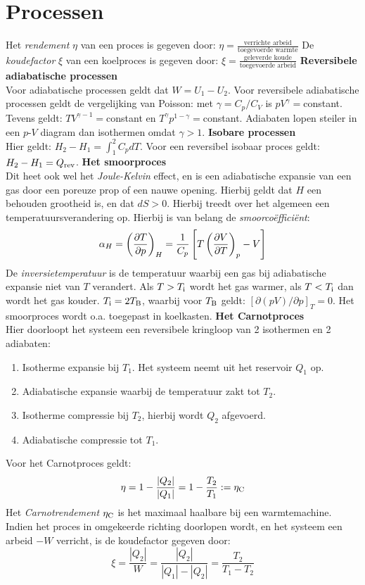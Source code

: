 \section{Processen}
Het {\it rendement} $\eta$ van een proces is gegeven door:
$\displaystyle\eta=\frac{\mbox{verrichte arbeid}}{\mbox{toegevoerde warmte}}$
\npar
De {\it koudefactor} $\xi$ van een koelproces is gegeven door:
$\displaystyle\xi=\frac{\mbox{geleverde koude}}{\mbox{toegevoerde arbeid}}$
\npar
{\bf Reversibele adiabatische processen}\\[2mm]
Voor adiabatische processen geldt dat $W=U_1-U_2$. Voor reversibele
adiabatische processen geldt de vergelijking van Poisson: met
$\gamma=C_p/C_V$ is $pV^\gamma=$constant. Tevens geldt:
$TV^{\gamma-1}=$constant en $T^\gamma p^{1-\gamma}=$constant. Adiabaten lopen
steiler in een $p$-$V$ diagram dan isothermen omdat $\gamma>1$.
\npar
{\bf Isobare processen}\\[2mm]
Hier geldt: $H_2-H_1=\int_1^2 C_pdT$. Voor een reversibel isobaar proces
geldt: $H_2-H_1=Q_{\rm rev}$.
\npar
{\bf Het smoorproces}\\[2mm]
Dit heet ook wel het {\it Joule-Kelvin} effect, en is een adiabatische
expansie van een gas door een poreuze prop of een nauwe opening. Hierbij
geldt dat $H$ een behouden grootheid is, en dat $dS>0$. Hierbij treedt over
het algemeen een temperatuursverandering op. Hierbij is van belang de
{\it smoorco\"effici\"ent}:
\[
\alpha_H=\left(\frac{\partial T}{\partial p}\right)_{H}=\frac{1}{C_p}\left[T\left(\frac{\partial V}{\partial T}\right)_{p}-V\right]
\]
De {\it inversietemperatuur} is de temperatuur waarbij een gas bij
adiabatische expansie niet van $T$ verandert. Als $T>T_{\rm i}$ wordt het gas
warmer, als $T<T_{\rm i}$ dan wordt het gas kouder. $T_{\rm i}=2T_{\rm B}$,
waarbij voor $T_{\rm B}$ geldt: $[\partial(pV)/\partial p]_T=0$. Het
smoorproces wordt o.a. toegepast in koelkasten.
\npar
{\bf Het Carnotproces}\\[2mm]
Hier doorloopt het systeem een reversibele kringloop van 2 isothermen en 2
adiabaten:
\begin{enumerate}
\item Isotherme expansie bij $T_1$. Het systeem neemt uit het reservoir $Q_1$ op.
\item Adiabatische expansie waarbij de temperatuur zakt tot $T_2$.
\item Isotherme compressie bij $T_2$, hierbij wordt $Q_2$ afgevoerd.
\item Adiabatische compressie tot $T_1$.
\end{enumerate}
Voor het Carnotproces geldt:
\[
\eta=1-\frac{|Q_2|}{|Q_1|}=1-\frac{T_2}{T_1}:=\eta_{\rm C}
\]
Het {\it Carnotrendement} $\eta_{\rm C}$ is het maximaal haalbare bij een
warmtemachine. Indien het proces in omgekeerde richting doorlopen wordt, en
het systeem een arbeid $-W$ verricht, is de koudefactor gegeven door:
\[
\xi=\frac{|Q_2|}{W}=\frac{|Q_2|}{|Q_1|-|Q_2|}=\frac{T_2}{T_1-T_2}
\]

